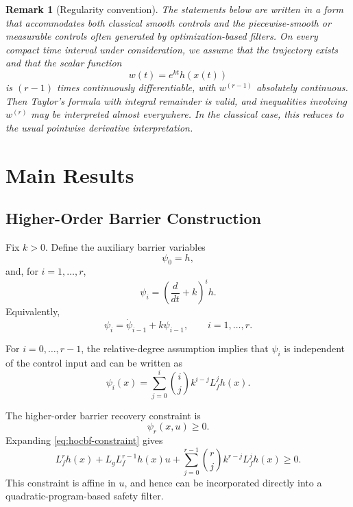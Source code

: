 \documentclass[11pt]{article}
\newtheorem{remark}{Remark}
\newcommand{\Dt}{\frac{d}{dt}}
\begin{document}
\begin{remark}[Regularity convention]
The statements below are written in a form that accommodates both classical smooth controls and the piecewise-smooth or measurable controls often generated by optimization-based filters. On every compact time interval under consideration, we assume that the trajectory exists and that the scalar function
\begin{equation}
w(t)=e^{kt}h(x(t))
\end{equation}
is $(r-1)$ times continuously differentiable, with $w^{(r-1)}$ absolutely continuous. Then Taylor's formula with integral remainder is valid, and inequalities involving $w^{(r)}$ may be interpreted almost everywhere. In the classical case, this reduces to the usual pointwise derivative interpretation.
\end{remark}

\section{Main Results}

\subsection{Higher-Order Barrier Construction}

Fix $k>0$. Define the auxiliary barrier variables
\begin{equation}
\psi_0 = h,
\end{equation}
and, for $i=1,\dots,r$,
\begin{equation}
\psi_i
=
\left(\Dt+k\right)^i h.
\label{eq:psi-definition}
\end{equation}
Equivalently,
\begin{equation}
\psi_i
=
\dot\psi_{i-1}+k\psi_{i-1},
\qquad i=1,\dots,r.
\label{eq:recursive-psi}
\end{equation}

For $i=0,\dots,r-1$, the relative-degree assumption implies that $\psi_i$ is independent of the control input and can be written as
\begin{equation}
\psi_i(x)
=
\sum_{j=0}^{i}
\binom{i}{j}
k^{i-j}L_f^j h(x).
\label{eq:psi-expansion}
\end{equation}

The higher-order barrier recovery constraint is
\begin{equation}
\psi_r(x,u)\ge0.
\label{eq:hocbf-constraint}
\end{equation}
Expanding \eqref{eq:hocbf-constraint} gives
\begin{equation}
L_f^r h(x)
+
L_gL_f^{r-1}h(x)u
+
\sum_{j=0}^{r-1}
\binom{r}{j}
k^{r-j}L_f^j h(x)
\ge0.
\label{eq:expanded-hocbf}
\end{equation}
This constraint is affine in $u$, and hence can be incorporated directly into a quadratic-program-based safety filter.
\end{document}

